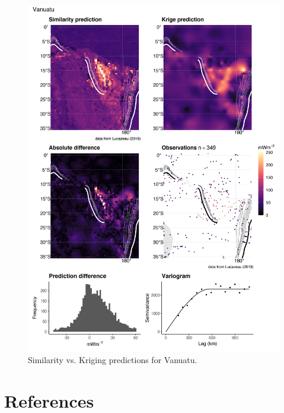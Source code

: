 \documentclass[draft,linenumbers]{agujournal2018}
\begin{document}
\begin{figure}[h]

{\centering \includegraphics[width=0.95\linewidth,]{../figs/diff/comp/Vanuatu} 

}

\caption{Similarity vs. Kriging predictions for Vanuatu.}\label{fig:vanuatu.comp}
\end{figure}

\clearpage

\section*{References}
\end{document}
